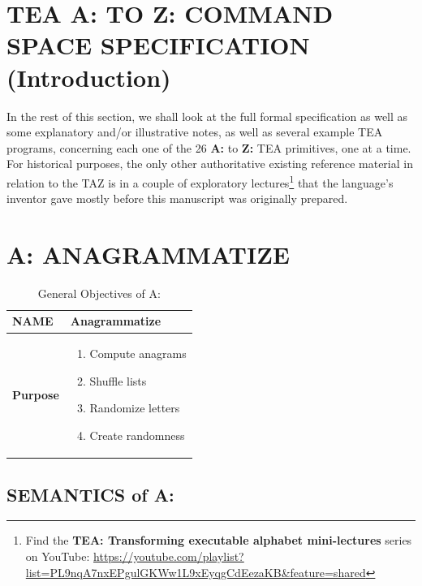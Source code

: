 \documentclass[a4paper, 18pt]{book} %
\begin{document}
\chapter{TEA A: TO Z: COMMAND SPACE SPECIFICATION (Introduction)}
\label{SECTAZ}

In the rest of this section, we shall look at the full formal specification as well as some explanatory and/or illustrative notes, as well as several example TEA programs, concerning each one of the 26 \textbf{A:} to \textbf{Z:} TEA primitives, one at a time. For historical purposes, the only other authoritative existing reference material in relation to the TAZ is in a couple of exploratory lectures\footnote{Find the \textbf{TEA: Transforming executable alphabet mini-lectures} series on YouTube: \url{https://youtube.com/playlist?list=PL9nqA7nxEPgulGKWw1L9xEyqgCdEezaKB&feature=shared}} that the language’s inventor gave mostly before this manuscript was originally prepared.

\chapter{A: ANAGRAMMATIZE}
\label{CHAPA}


\begin{table}[H]
  \centering
  \LARGE
	\begin{tabular}[t]{|p{}|p{}}
 
	\textbf{NAME} & Anagrammatize\\
	\hline
	\textbf{Purpose} & \begin{enumerate}
	\item Compute anagrams
	\item Shuffle lists
	\item Randomize letters
	\item Create randomness
	\end{enumerate}\\
	\hline
	              
\end{tabular}
\caption{General Objectives of A:}
  \label{TABTAZA}
\end{table}


\section{SEMANTICS of A:}
\label{SECSEMA}
\end{document}
